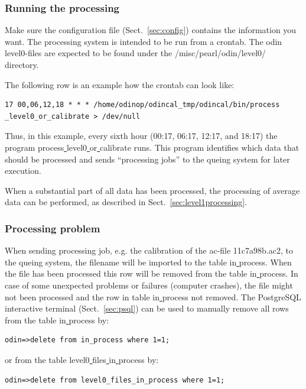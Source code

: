 \documentclass[12pt]{article}
\begin{document}
\subsubsection{Running the processing}
Make sure the configuration file (Sect.~\ref{sec:config}) contains
the information you want.  
The processing system is intended to be run from a crontab.
The odin level0-files are expected to be found
under the /misc/pearl/odin/level0/ directory.

The following row is an example how the crontab can look like: 
\begin{verbatim}
17 00,06,12,18 * * * /home/odinop/odincal_tmp/odincal/bin/process
_level0_or_calibrate > /dev/null
\end{verbatim}
Thus, in this example, every sixth hour (00:17, 06:17, 12:17, and 18:17)
the program process\underline{ }level0\underline{ }or\underline{ }calibrate
runs. This program identifies which data that should be processed
and sends ``processing jobs'' to the queing system for later execution.

When a substantial part of all data has been processed,
the processing of average data can be performed, as described in
Sect.~\ref{sec:level1processing}.

\subsubsection*{Processing problem}
When sending processing job, e.g. the calibration of the 
ac-file 11c7a98b.ac2, to the queing system, 
the filename will be imported to the table in\underline{ }process.
When the file has been processed this row will be removed 
from the table in\underline{ }process.
In case of some unexpected problems or failures (computer crashes),
the file might not been processed and the row in table in\underline{ }process 
not removed.
The PostgreSQL interactive terminal (Sect.~\ref{sec:psql}) 
can be used to manually remove all rows from the table in\underline{ }process
by:
\begin{verbatim}
odin=>delete from in_process where 1=1;
\end{verbatim}
or from the table level0\underline{ }files\underline{ }in\underline{ }process
by:
\begin{verbatim}
odin=>delete from level0_files_in_process where 1=1;
\end{verbatim}


 
\end{document}
